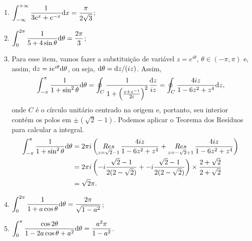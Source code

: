 \begin{questions}
\begin{solution}
\begin{enumerate}[label=(\alph*)]
      \item $\displaystyle \int_{-\infty}^{+\infty} \frac{1}{3e^{x} + e^{-x}} \mathrm{d} x = \frac{\pi}{2\sqrt{3}}$;
      
      \item $\displaystyle \int_{0}^{2\pi} \frac{1}{5 + 4\sin\theta} \mathrm{d} \theta = \frac{2\pi}{{3}}$;
      
      \item Para esse item, vamos fazer a substituição de variável $z=e^{i\theta}$, $\theta\in(-\pi,\pi)$ e, assim, $\mathrm{d} z = i e^{i\theta} \mathrm{d} \theta$, ou seja, $\mathrm{d}\theta = \mathrm{d} z/(iz)$. Assim,
      \begin{align*}
        \int_{-\pi}^{\pi} \frac{1}{1 + \sin^2\theta} \mathrm{d} \theta
            = \oint_C \frac{1}{1 + \left(\frac{z+z^{-1}}{2i}\right)^2} \frac{\mathrm{d} z}{iz} = \oint_C \frac{4 i z}{1 - 6 z^2 + z^4} \mathrm{d} z,
      \end{align*}
      onde $C$ é o círculo unitário centrado na origem e, portanto, seu interior contém os polos em $\pm(\sqrt{2}-1)$. Podemos aplicar o Teorema dos Resíduos para calcular a integral.
      \begin{align*}
          \int_{-\pi}^{\pi} \frac{1}{1 + \sin^2\theta} \mathrm{d} \theta
            &= 2\pi i\left( \mathop{Res}\limits_{z=\sqrt{2}-1} \frac{4 i z}{1 - 6 z^2 + z^4} + \mathop{Res}\limits_{z=-\sqrt{2}+1} \frac{4 i z}{1 - 6 z^2 + z^4} \right) \\
            &= 2\pi i \left( -i\frac{\sqrt{2}-1}{2(2-\sqrt{2})} + -i\frac{\sqrt{2}-1}{2(2-\sqrt{2})} \right)\times\frac{2+\sqrt{2}}{2+\sqrt{2}}\\
            &= \sqrt{2}\pi.
      \end{align*}
      
      \item $\displaystyle \int_{0}^{2\pi} \frac{1}{1 + a\cos\theta} \mathrm{d} \theta = \frac{2\pi}{\sqrt{1-a^2}}$;
      
      \item $\displaystyle \int_{0}^{\pi} \frac{\cos 2\theta}{1 - 2a \cos\theta + a^2} \mathrm{d} \theta = \frac{a^2\pi}{1 - a^2}$.
\end{enumerate}
\end{solution}

\end{questions}
